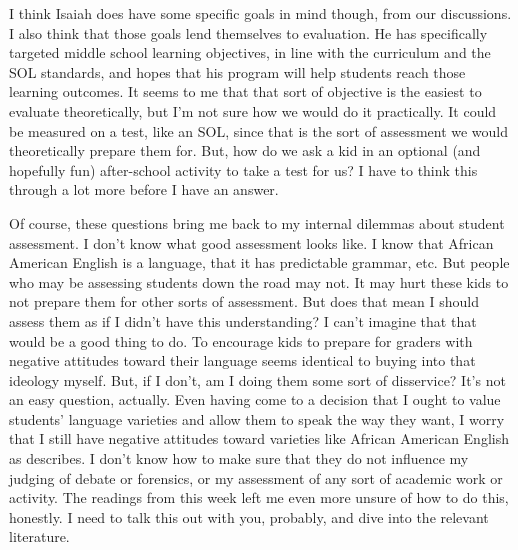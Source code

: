 \documentclass[man,12pt,natbib]{apa6}
\begin{document}
I think Isaiah does have some specific goals in mind though, from our
discussions. I also think that those goals lend themselves to evaluation.  He
has specifically targeted middle school learning objectives, in line with the
curriculum and the SOL standards, and hopes that his program will help students
reach those learning outcomes. 
It seems to me that that sort of objective is the easiest to evaluate
theoretically, but I'm not sure how we would do it practically. It could be
measured on a test, like an SOL, since that is the sort of assessment we would
theoretically prepare them for. But, how do we ask a kid in an optional (and
hopefully fun) after-school activity to take a test for us? 
I have to think this through a lot more before I have an answer.

Of course, these questions bring me back to my internal dilemmas about student
assessment. I don't know what good assessment looks like. I know that African
American English is a language, that it has predictable grammar, etc. But
people who may be assessing students down the road may not. It may hurt these
kids to not prepare them for other sorts of assessment. 
But does that mean I should assess them as if I didn't have this understanding?
I can't imagine that that would be a good thing to do.  To encourage kids to
prepare for graders with negative attitudes toward their language seems
identical to buying into that ideology myself. But, if I don't, am I doing them
some sort of disservice? It's not an easy question, actually. 
Even having come to a decision that I ought to value students' language
varieties and allow them to speak the way they want, I worry that I still have
negative attitudes toward varieties like African American English as
\citet{Lippi-Green11} describes. I don't know how to make sure that they do not
influence my judging of debate or forensics, or my assessment of any sort of
academic work or activity. The readings from this week left me even more unsure
of how to do this, honestly. I need to talk this out with you, probably, and
dive into the relevant literature. 

\nocite{CharityHudley10}

\clearpage

\end{document}
